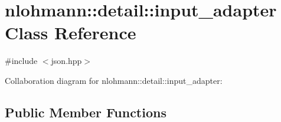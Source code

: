 \hypertarget{classnlohmann_1_1detail_1_1input__adapter}{}\section{nlohmann\+:\+:detail\+:\+:input\+\_\+adapter Class Reference}
\label{classnlohmann_1_1detail_1_1input__adapter}


{\ttfamily \#include $<$json.\+hpp$>$}



Collaboration diagram for nlohmann\+:\+:detail\+:\+:input\+\_\+adapter\+:
\subsection*{Public Member Functions}
